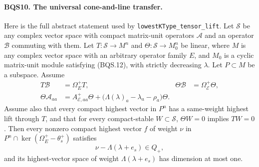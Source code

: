 \documentclass[11pt,a4paper]{article}
\numberwithin{equation}{section}
\theoremstyle{remark}\newtheorem{remark}[theorem]{Remark}
\begin{document}
\paragraph{BQS10. The universal cone-and-line transfer.}
\label{claim:BQS10}
Here is the full abstract statement used by
\texttt{lowest\allowbreak KType\_\allowbreak tensor\_\allowbreak lift}.  Let $\mathcal S$ be any complex
vector space with compact matrix-unit operators $\mathcal A$ and an
operator $\mathcal B$ commuting with them.  Let
$T:\mathcal S\to M^n$ and $\Theta:\mathcal S\to M_0^n$ be linear,
where $M$ is any complex vector space with an arbitrary operator
family $E$, and $M_0$ is a cyclic matrix-unit module satisfying (BQS.12), with strictly
decreasing $\lambda$.  Let $P\subset M$ be a subspace.  Assume
\[
\begin{aligned}
 T\mathcal B&=\Omega^+_E T,&
 \Theta\mathcal B&=\Omega^+_{\mathcal E}\Theta,\\
 \Theta\mathcal A_{aa}
  &=A^+_{\mathcal E,aa}\Theta+
           \bigl(\Lambda(\lambda)_a-\lambda_a-\rho_a\bigr)\Theta.
\end{aligned}
\tag{BQS.30}
\]
Assume also that every compact highest vector in $P^n$ has a
same-weight highest lift through $T$, and that for every compact-stable
$W\subset\mathcal S$, $\Theta W=0$ implies $TW=0$.
Then every nonzero compact highest vector $f$ of weight $\nu$ in
$P^n\cap\ker(\Omega^+_E-\theta_s^+)$ satisfies
\[
                      \nu-\Lambda(\lambda+e_s)\in Q_+,
 \tag{BQS.31}
\]
and its highest-vector space of weight $\Lambda(\lambda+e_s)$
has dimension at most one.
\end{document}

